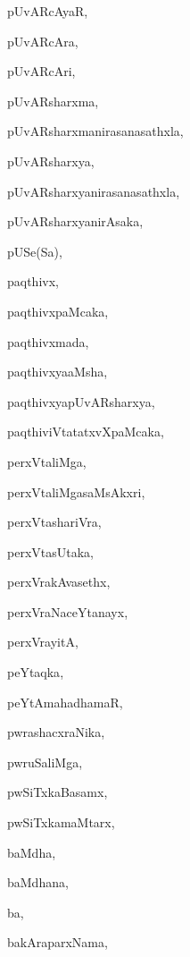 \begin{multicols}{2}
{pUvARcAyaR}, \pageref{pUvARcAyaR}

{pUvARcAra}, \pageref{pUvARcAra}

{pUvARcAri}, \pageref{pUvARcAri}

{pUvARsharxma}, \pageref{pUvARsharxma}

{pUvARsharxmanirasanasathxla}, \pageref{pUvARsharxmanirasanasathxla}

{pUvARsharxya}, \pageref{pUvARsharxya}

{pUvARsharxyanirasanasathxla}, \pageref{pUvARsharxyanirasanasathxla}

{pUvARsharxyanirAsaka}, \pageref{pUvARsharxyanirAsaka}

{pUSe(Sa)}, \pageref{pUSeSa}

{paqthivx}, \pageref{paqthivx}

{paqthivxpaMcaka}, \pageref{paqthivxpaMcaka}

{paqthivxmada}, \pageref{paqthivxmada}

{paqthivxyaaMsha}, \pageref{paqthivxyaaMsha}

{paqthivxyapUvARsharxya}, \pageref{paqthivxyapUvARsharxya}

{paqthiviVtatatxvXpaMcaka}, \pageref{paqthiviVtatatxvXpaMcaka}

{perxVtaliMga}, \pageref{perxVtaliMga}

{perxVtaliMgasaMsAkxri}, \pageref{perxVtaliMgasaMsAkxri}

{perxVtashariVra}, \pageref{perxVtashariVra}

{perxVtasUtaka}, \pageref{perxVtasUtaka}

{perxVrakAvasethx}, \pageref{perxVrakAvasethx}

{perxVraNaceYtanayx}, \pageref{perxVraNaceYtanayx}

{perxVrayitA}, \pageref{perxVrayitA}

{peYtaqka}, \pageref{peYtaqka}

{peYtAmahadhamaR}, \pageref{peYtAmahadhamaR}

{pwrashacxraNika}, \pageref{pwrashacxraNika}

{pwruSaliMga}, \pageref{pwruSaliMga}

{pwSiTxkaBasamx}, \pageref{pwSiTxkaBasamx}

{pwSiTxkamaMtarx}, \pageref{pwSiTxkamaMtarx}

{baMdha}, \pageref{baMdha}

{baMdhana}, \pageref{baMdhana}

{ba}, \pageref{ba}

{bakAraparxNama}, \pageref{bakAraparxNama}


\end{multicols}
